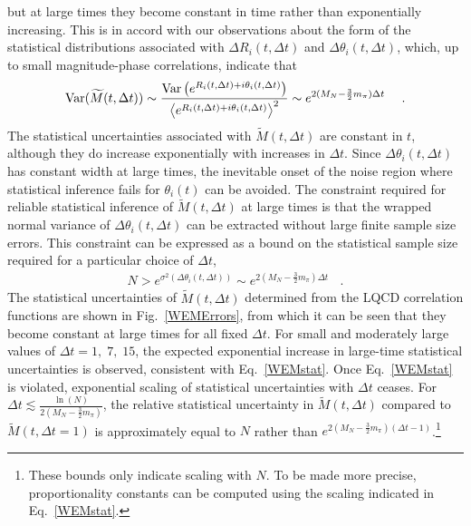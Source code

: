but at large times they become constant in time rather than exponentially increasing. 
This is in accord with our observations about the form of the statistical distributions associated with
$\Delta R_i(t, \Delta t)$ and $\Delta \theta_i(t, \Delta t)$, 
which,  up to small magnitude-phase correlations, indicate that
%
\begin{equation}
  \begin{split}
    \text{Var}(\widetilde{M}(t,\Delta t))  \sim \frac{\text{Var}\left( e^{R_i(t, \Delta t) + i \theta_i(t, \Delta t)} \right)}{\left< e^{R_i(t, \Delta t) + i \theta_i(t, \Delta t)} \right>^2} \sim e^{2(M_N - \frac{3}{2}m_\pi)\Delta t}
    \ \ \ \  .
  \end{split}
  \label{impscaling}
\end{equation}
%
The statistical uncertainties associated with $\tilde{M}(t, \Delta t)$ are constant in $t$, 
although they do increase exponentially with increases in $\Delta t$. 
Since $\Delta \theta_i(t, \Delta t)$ has constant width at large times, 
the inevitable onset of the noise region where statistical inference fails for $\theta_i(t)$ can be avoided. 
The constraint required for reliable statistical inference of $\tilde{M}(t, \Delta t)$ at large times is that the wrapped 
normal variance of $\Delta \theta_i(t, \Delta t)$ can be extracted without large finite sample size errors. 
This constraint can be expressed as a bound on the statistical sample size required for a particular choice of $\Delta t$,
%
\begin{equation}
  \begin{split}
    N > e^{\sigma^2(\Delta \theta_i(t, \Delta t))} \sim e^{2(M_N - \frac{3}{2}m_\pi)\Delta t}
    \ \ \ \ .
  \end{split}
  \label{WEMstat}
\end{equation}
%
The statistical uncertainties of $\tilde{M}(t, \Delta t)$ determined from the LQCD correlation functions  are shown in Fig.~\ref{WEMErrors},
from which it can be seen that they become constant at large times for all fixed $\Delta t$. 
For small and moderately large values of $\Delta t = 1,\;7,\;15$, 
the expected exponential increase in large-time statistical uncertainties is observed,
consistent with Eq.~\eqref{WEMstat}. 
Once Eq.~\eqref{WEMstat} is violated, exponential scaling of statistical uncertainties with $\Delta t$ ceases. 
For $\Delta t \lesssim \frac{\ln(N)}{2(M_N - \frac{3}{2}m_\pi)}$, the relative statistical uncertainty in $\tilde{M}(t, \Delta t)$ 
compared to $\tilde{M}(t, \Delta t =1)$ is approximately equal to $N$ rather than $e^{2(M_N - \frac{3}{2}m_\pi)(\Delta t -1)}$.\footnote{These bounds only indicate scaling with $N$. To be made more precise, proportionality constants can be computed using the scaling indicated in Eq.~\eqref{WEMstat}.}
